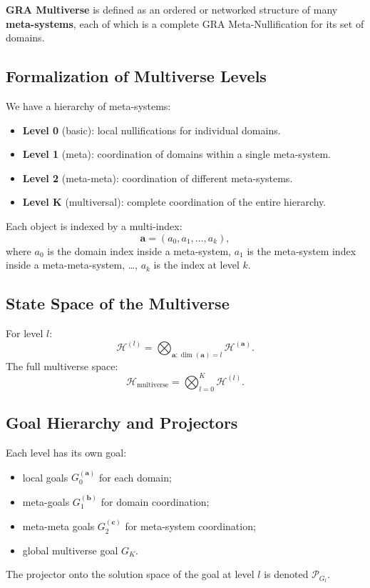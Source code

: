 \documentclass[12pt,a4paper]{article}
\begin{document}
\textbf{GRA Multiverse} is defined as an ordered or networked structure of many \textbf{meta-systems}, each of which is a complete GRA Meta-Nullification for its set of domains.

\subsection{Formalization of Multiverse Levels}

We have a hierarchy of meta-systems:
\begin{itemize}
    \item \textbf{Level 0} (basic): local nullifications for individual domains.
    \item \textbf{Level 1} (meta): coordination of domains within a single meta-system.
    \item \textbf{Level 2} (meta-meta): coordination of different meta-systems.
    \item \textbf{Level K} (multiversal): complete coordination of the entire hierarchy.
\end{itemize}

Each object is indexed by a multi-index:
\[
\mathbf{a} = (a_0, a_1, \dots, a_k),
\]
where \(a_0\) is the domain index inside a meta-system, \(a_1\) is the meta-system index inside a meta-meta-system, …, \(a_k\) is the index at level \(k\).

\subsection{State Space of the Multiverse}

For level \(l\):
\[
\mathcal{H}^{(l)} = \bigotimes_{\mathbf{a}: \dim(\mathbf{a})=l} \mathcal{H}^{(\mathbf{a})}.
\]
The full multiverse space:
\[
\mathcal{H}_{\text{multiverse}} = \bigotimes_{l=0}^K \mathcal{H}^{(l)}.
\]

\subsection{Goal Hierarchy and Projectors}

Each level has its own goal:
\begin{itemize}
    \item local goals \(G_0^{(\mathbf{a})}\) for each domain;
    \item meta-goals \(G_1^{(\mathbf{b})}\) for domain coordination;
    \item meta-meta goals \(G_2^{(\mathbf{c})}\) for meta-system coordination;
    \item global multiverse goal \(G_K\).
\end{itemize}
The projector onto the solution space of the goal at level \(l\) is denoted \(\mathcal{P}_{G_l}\).
\end{document}
